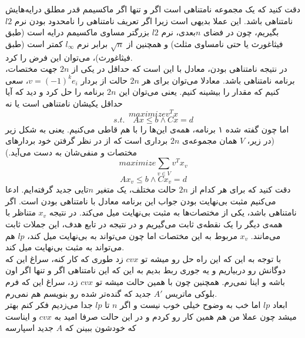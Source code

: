 دقت کنید که یک مجموعه نامتناهی است اگر و تنها اگر 
ماکسیمم قدر مطلق درایه‌هایش نامتناهی باشد. این عملا بدیهی است زیرا اگر تعریف نامتناهی را نامحدود بودن نرم $l2$ بگیریم، چون در فضای $n$بعدی، نرم $l2$ بزرگتر مساوی ماکسیمم درایه است  (طبق فیثاغورث یا حتی نامساوی مثلث) و همچنین از
$\sqrt{n}$
برابر نرم $l_\infty$ کمتر است (طبق فیثاغورث)، می‌توان این فرض را کرد.\\
در نتیجه نامتناهی بودن، معادل با این است که حداقل در یکی از $2n$ جهت مختصات، برنامه نامتناهی باشد. معادلا می‌توان برای هر $2n$ حالت از بردار 
$v=(-1)^{k}e_i$،
سعی کنیم که مقدار را بیشینه کنیم. یعنی می‌توان این $2n$ برنامه را حل کرد و دید که آیا حداقل یکیشان نامتناهی است یا نه
\[
maximize v^Tx\]\[
s.t. \quad Ax \le b \land Cx = d
\]
اما چون گفته شده ۱ برنامه، همه‌ی این‌ها را با هم قاطی می‌کنیم. یعنی به شکل زیر (در زیر، $V$ همان مجموعه‌ی $2n$ برداری است که از در نظر گرفتن خود بردار‌های مختصات و منفی‌شان به دست می‌آید.)
\[
maximize \sum_{v \in V} v^Tx_{v}\]\[
Ax_{v} \le b \land Cx_{v} = d
\]
دقت کنید که برای هر کدام از $2n$ حالت مختلف، یک متغیر $n$‌تایی جدید گرفته‌ایم. ادعا می‌کنیم مثبت بی‌نهایت بودن جواب این برنامه معادل با نامتناهی بودن 
است. اگر 
نامتناهی باشد، یکی از مختصات‌ها به مثبت بی‌نهایت میل می‌کند. در نتیجه 
$x_{v}$
متناظر با همه‌ی دیگر را یک نقطه‌ی ثابت می‌گیریم و در نتیجه در تابع هدف، این جملات ثابت می‌مانند. 
$x_{v}$
مربوط به این مختصات اما چون می‌تواند به بی‌نهایت میل کند، $lp$ هم می‌تواند به مثبت بی‌نهایت میل کند.\\
با توجه به این که این راه حل رو میشه تو $cvx$ زد طوری که کار کنه، سراغ این که دوگانش رو دربیاریم و یه جوری ربط بدیم به این که این نامتناهی اگر و تنها اگر اون 
باشه و اینا نمی‌رم. همچنین چون با همین حالت میشه تو $cvx$ زد، سراغ این که فرم بلوکی ماتریس $A'$ جدید که گنده‌تر شده رو بنویسم هم نمی‌رم.\\
ابعاد
$lp$
اما خب به وضوح خیلی خوب نیست و اگر $n$ تا $lp$ جدا می‌زدیم فکر کنم بهتر میشد چون عملا من هم همین کار رو کردم و در این حالت صرفا امید به $cvx$ و ایناست که خودشون ببینن که $A$ جدید اسپارسه